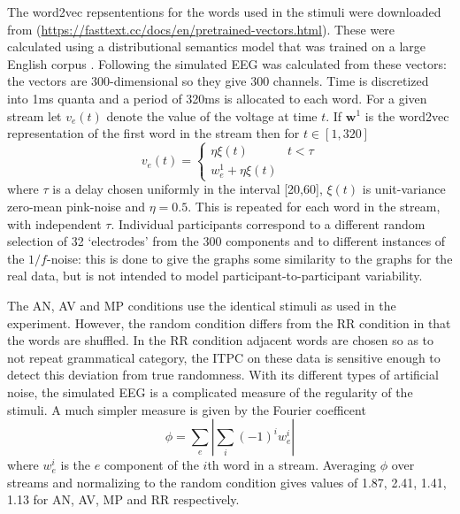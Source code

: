 \documentclass[11pt,a4wide]{article}
\newcommand{\citet}[1]{\cite{#1}}
\begin{document}
The word2vec repsententions for the words used in the stimuli were
downloaded from
(\url{https://fasttext.cc/docs/en/pretrained-vectors.html}). These
were calculated using a distributional semantics model that was
trained on a large English corpus \citet{Bojanowski2017}. Following
\cite{FrankYang2018} the simulated EEG was calculated from these
vectors: the vectors are 300-dimensional so they give 300 channels.
Time is discretized into 1ms quanta and a period of 320ms is allocated
to each word. For a given stream let $v_e(t)$ denote the value of the
voltage at time $t$. If $\textbf{w}^1$ is the word2vec representation
of the first word in the stream then for $t\in [1,320]$
\begin{equation}
  v_e(t)=\left\{\begin{array}{ll}\eta\xi(t)&t<\tau\\ w^1_e+\eta\xi(t)\end{array}\right.
\end{equation}
where $\tau$ is a delay chosen uniformly in the interval [20,60],
$\xi(t)$ is unit-variance zero-mean pink-noise and $\eta=0.5$. This is
repeated for each word in the stream, with independent
$\tau$. Individual participants correspond to a different random
selection of 32 `electrodes' from the 300 components and to different
instances of the $1/f$-noise: this is done to give the graphs some
similarity to the graphs for the real data, but is not intended to
model participant-to-participant variability.

The AN, AV and MP conditions use the identical stimuli as used in the
experiment. However, the random condition differs from the RR
condition in that the words are shuffled. In the RR condition adjacent
words are chosen so as to not repeat grammatical category, the ITPC on
these data is sensitive enough to detect this deviation from true
randomness. With its different types of artificial noise, the
simulated EEG is a complicated measure of the regularity of the
stimuli. A much simpler measure is given by the Fourier coefficent
\begin{equation}
  \phi= \sum_e\left|\sum_i (-1)^iw_e^i\right|
\end{equation}
where $w_e^i$ is the $e$ component of the $i$th word in a
stream. Averaging $\phi$ over streams and normalizing to the random
condition gives values of 1.87, 2.41, 1.41, 1.13 for AN, AV, MP and RR
respectively.
\end{document}
